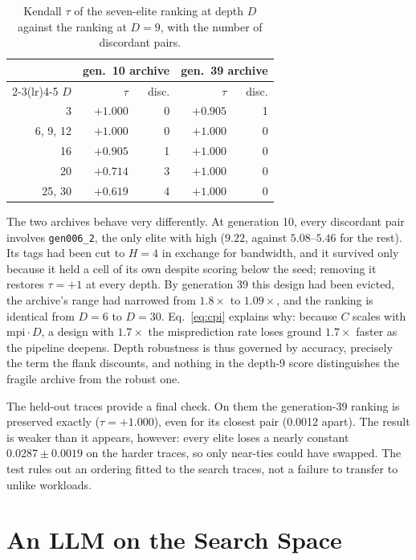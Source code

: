\documentclass[conference]{IEEEtran}
\newcommand{\mpki}{\text{MPKI}}
\begin{document}
\begin{table}[t]
\caption{Kendall $\tau$ of the seven-elite ranking at depth $D$ against the
ranking at $D=9$, with the number of discordant pairs.}
\label{tab:tau}
\centering\footnotesize
\begin{tabular}{@{}rrrrr@{}}
\toprule
& \multicolumn{2}{c}{gen.\ 10 archive} & \multicolumn{2}{c}{gen.\ 39 archive} \\
\cmidrule(lr){2-3}\cmidrule(lr){4-5}
$D$ & $\tau$ & disc. & $\tau$ & disc. \\
\midrule
3        & $+1.000$ & 0 & $+0.905$ & 1 \\
6, 9, 12 & $+1.000$ & 0 & $+1.000$ & 0 \\
16       & $+0.905$ & 1 & $+1.000$ & 0 \\
20       & $+0.714$ & 3 & $+1.000$ & 0 \\
25, 30   & $+0.619$ & 4 & $+1.000$ & 0 \\
\bottomrule
\end{tabular}
\end{table}

The two archives behave very differently. At generation 10, every discordant
pair involves \texttt{gen006\_2}, the only elite with high \mpki{} ($9.22$,
against $5.08$--$5.46$ for the rest). Its tags had been cut to $H=4$ in exchange
for bandwidth, and it survived only because it held a cell of its own despite
scoring below the seed; removing it restores $\tau=+1$ at every depth. By
generation 39 this design had been evicted, the archive's \mpki{} range had
narrowed from $1.8\times$ to $1.09\times$, and the ranking is identical from
$D=6$ to $D=30$. Eq.~\eqref{eq:cpi} explains why: because $C$ scales with
$\text{mpi}\cdot D$, a design with $1.7\times$ the misprediction rate loses
ground $1.7\times$ faster as the pipeline deepens. Depth robustness is thus
governed by accuracy, precisely the term the flank discounts, and nothing in the
depth-9 score distinguishes the fragile archive from the robust one.

The held-out traces provide a final check. On them the generation-39 ranking is
preserved exactly ($\tau=+1.000$), even for its closest pair (0.0012 apart).
The result is weaker than it appears, however: every elite loses a nearly
constant $0.0287\pm0.0019$ on the harder traces, so only near-ties could have
swapped. The test rules out an ordering fitted to the search traces, not a
failure to transfer to unlike workloads.

\section{An LLM on the Search Space}
\label{sec:bounds}
\end{document}
